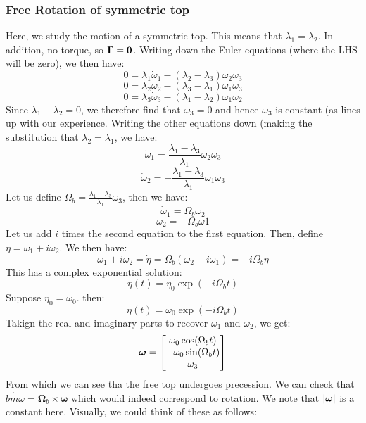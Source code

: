 \documentclass[../PHYS306Notes.tex]{subfiles}
\begin{document}
\subsubsection{Free Rotation of symmetric top}
Here, we study the motion of a symmetric top. This means that $\lambda_1 = \lambda_2$. In addition, no torque, so $\bm{\Gamma} = \mathbf{0}$. Writing down the Euler equations (where the LHS will be zero), we then have:
\[0 = \lambda_1\dot{\omega}_1 - (\lambda_2 - \lambda_3)\omega_2\omega_3\]
\[0 = \lambda_2\dot{\omega}_2 - (\lambda_3 - \lambda_1)\omega_1\omega_3\]
\[0 = \lambda_3\dot{\omega}_3 - (\lambda_1 - \lambda_2)\omega_1\omega_2\]
Since $\lambda_1 - \lambda_2 = 0$, we therefore find that $\dot{\omega}_3 = 0$ and hence $\omega_3$ is constant (as lines up with our experience. Writing the other equations down (making the substitution that $\lambda_2 = \lambda_1$, we have:
\[\dot{\omega}_1 = \frac{\lambda_1 - \lambda_3}{\lambda_1}\omega_2\omega_3\]
\[\dot{\omega}_2 = -\frac{\lambda_1 - \lambda_3}{\lambda_1}\omega_1\omega_3\]
Let us define $\Omega_b = \frac{\lambda_1 - \lambda_3}{\lambda_1}\omega_3$, then we have:
\[\dot{\omega}_1 = \Omega_b\omega_2\]
\[\dot{\omega}_2 = -\Omega_b\omega1\]
Let us add $i$ times the second equation to the first equation. Then, define $\eta = \omega_1 + i\omega_2$. We then have:
\[\dot{\omega}_1 + i\dot{\omega}_2 = \dot{\eta} = \Omega_b(\omega_2 - i\omega_1) = -i\Omega_b\eta\]
This has a complex exponential solution:
\[\eta(t) = \eta_0\exp(-i\Omega_b t)\]
Suppose $\eta_0 = \omega_0$. then:
\[\eta(t) = \omega_0\exp(-i\Omega_b t)\]
Takign the real and imaginary parts to recover $\omega_1$ and $\omega_2$, we get:
\[\bm{\omega} = \begin{bmatrix}\omega_0\cos(\Omega_b t) \\ -\omega_0\sin(\Omega_b t) \\ \omega_3\end{bmatrix}\]
From which we can see tha the free top undergoes precession. We can check that $\dot{bm{\omega}} = \bm{\Omega}_b \times \bm{\omega}$ which would indeed correspond to rotation. We note that $\abs{\bm{\omega}}$ is a constant here. Visually, we could think of these as follows:
\end{document}
